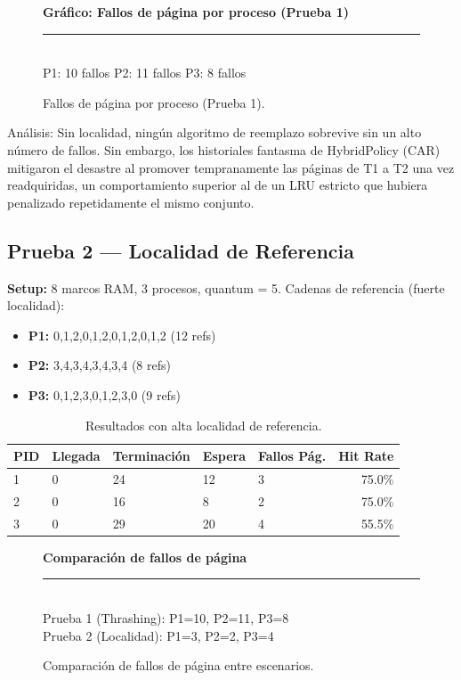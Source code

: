 \documentclass[12pt,letterpaper]{article}
\begin{document}
\begin{figure}[H]
\centering
\begin{tcolorbox}[colback=gray!10, colframe=gray!30, arc=4pt]
\centering
\textbf{Gráfico: Fallos de página por proceso (Prueba 1)}\\[0.5em]
\rule{\textwidth}{0.4pt}\\[0.5em]
P1: 10 fallos \hfill P2: 11 fallos \hfill P3: 8 fallos
\end{tcolorbox}
\caption{Fallos de página por proceso (Prueba 1).}
\end{figure}

Análisis: Sin localidad, ningún algoritmo de reemplazo sobrevive sin un alto número de fallos.
Sin embargo, los historiales fantasma de HybridPolicy (CAR) mitigaron el desastre al promover tempranamente las páginas de T1 a T2 una vez readquiridas, un comportamiento superior al de un LRU estricto que hubiera penalizado repetidamente el mismo conjunto.
\subsection{Prueba 2 --- Localidad de Referencia}
\textbf{Setup:} 8 marcos RAM, 3 procesos, quantum = 5.
Cadenas de referencia (fuerte localidad):
\begin{itemize}
    \item \textbf{P1:} 0,1,2,0,1,2,0,1,2,0,1,2 (12 refs)
    \item \textbf{P2:} 3,4,3,4,3,4,3,4 (8 refs)
    \item \textbf{P3:} 0,1,2,3,0,1,2,3,0 (9 refs)
\end{itemize}

\begin{table}[H]
\centering
{}
\begin{tabular}{@{}lllllr@{}}
\toprule
\rowcolor{catBlue!40}
\textbf{PID} & \textbf{Llegada} & \textbf{Terminación} & \textbf{Espera} & \textbf{Fallos Pág.} & \textbf{Hit Rate} \\ \midrule
1 & 0 & 24 & 12 & 3 & 75.0\% \\
2 & 0 & 16 & 8 & 2 & 75.0\% \\
3 & 0 & 29 & 20 & 4 & 55.5\% \\ \bottomrule
\end{tabular}
\caption{Resultados con alta localidad de referencia.}
\end{table}

\begin{figure}[H]
\centering
\begin{tcolorbox}[colback=gray!10, colframe=gray!30, arc=4pt]
\centering
\textbf{Comparación de fallos de página}\\[0.5em]
\rule{\textwidth}{0.4pt}\\[0.5em]
Prueba 1 (Thrashing): P1=10, P2=11, P3=8\\[0.2em]
Prueba 2 (Localidad): P1=3, P2=2, P3=4
\end{tcolorbox}
\caption{Comparación de fallos de página entre escenarios.}
\end{figure}
\end{document}
